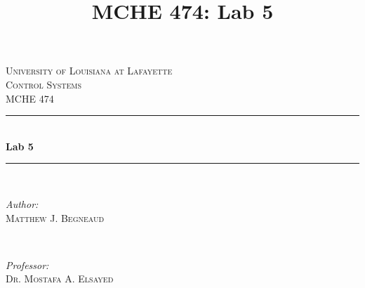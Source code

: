 \documentclass[12pt]{article}
\title{MCHE 474: Lab 5}
\begin{document}




\begin{titlepage}

\newcommand{\HRule}{\rule{\linewidth}{0.5mm}} %

\center %
 

\textsc{\LARGE University of Louisiana at Lafayette}\\[1.5cm] %
\textsc{\Large Control Systems}\\[0.5cm] %
\textsc{\large MCHE 474}\\[0.5cm] %


\HRule \\[0.4cm]
{ \huge \bfseries Lab 5}\\[0.4cm] %
\HRule \\[1.5cm]
 

\begin{minipage}{0.4\textwidth}
\begin{flushleft} \large
\emph{Author:}\\
\textsc{Matthew J. Begneaud} \\%
\end{flushleft}
\end{minipage}
~
\begin{minipage}{0.4\textwidth}
\begin{flushright} \large
\emph{Professor:} \\
\textsc{Dr. Mostafa A. Elsayed} %
\end{flushright}
\end{minipage}\\[1.5cm]


\end{titlepage}
\end{document}
